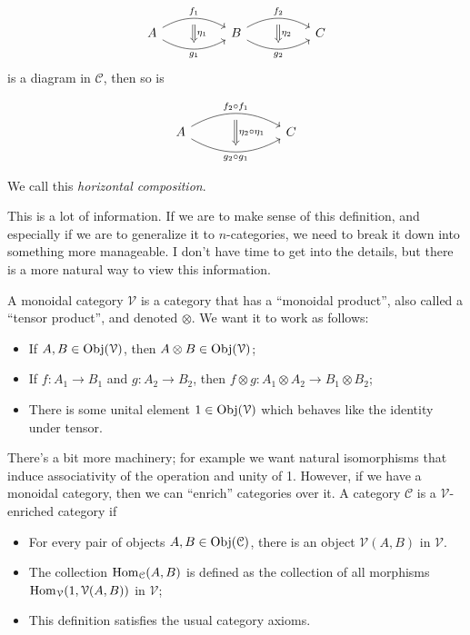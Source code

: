 \documentclass[11pt, letterpaper]{article}
\begin{document}
\begin{definition}
\begin{enumerate}
			\[\begin{tikzcd}[row sep = 5em, column sep = 5em]
				A\ar[r, bend left, "f_1"{name=f1}]\ar[r, bend right, "g_1"'{name=g1}]&B\ar[r, bend left, "f_2"{name=f2}]\ar[r, bend right, "g_2"'{name=g2}]&C
				\arrow[from=f1, to=g1, shorten=5px, Rightarrow, "\eta _1"]\arrow[from=f2, to=g2, shorten=5px, Rightarrow, "\eta _2"]
			\end{tikzcd}\]
			is a diagram in $\mathcal{C} $, then so is\newpage
			\begin{diagram}[ht]
			\[\begin{tikzcd}[row sep = 5em, column sep = 7em]
				A\ar[r, bend left, "f_2\circ f_1"{name=f}]\ar[r, bend right, "g_2\circ g_1"'{name=g}]&C
				\arrow[from=f, to=g, Rightarrow, shorten=5px, "\eta _2\circ \eta _1"]
			\end{tikzcd}\]
			\caption{Horizontal Composition}\label{dgm:10}
			\end{diagram}
			We call this \emph{horizontal composition}.
	\end{enumerate}
\end{definition}

This is a lot of information. If we are to make sense of this definition, and especially if we are to generalize it to $n$-categories, we need to break it down into something more manageable. I don't have time to get into the details, but there is a more natural way to view this information.

A monoidal category $\mathcal{V} $ is a category that has a ``monoidal product'', also called a ``tensor product'', and denoted $\otimes $. We want it to work as follows:
\begin{itemize}
	\item If $A,B\in \operatorname{Obj}(\mathcal{V} ) $, then $A\otimes B\in \operatorname{Obj}(\mathcal{V} ) $;
	\item If $f : A_1 \to B_1$ and $g : A_2 \to B_2$, then $f\otimes g : A_1\otimes A_2 \to B_1\otimes B_2$;
	\item There is some unital element $1\in \operatorname{Obj}(\mathcal{V} ) $ which behaves like the identity under tensor.
\end{itemize}
There's a bit more machinery; for example we want natural isomorphisms that induce associativity of the operation and unity of 1. However, if we have a monoidal category, then we can ``enrich'' categories over it. A category $\mathcal{C} $ is a $\mathcal{V} $-enriched category if
\begin{itemize}
	\item For every pair of objects $A,B\in \operatorname{Obj}(\mathcal{C} ) $, there is an object $\mathcal{V} (A,B)$ in $\mathcal{V} $.
	\item The collection $\operatorname{Hom}_{\mathcal{C} }(A, B) $ is defined as the collection of all morphisms $\operatorname{Hom}_{\mathcal{V} }(1, \mathcal{V} (A,B)) $ in $\mathcal{V} $;
	\item This definition satisfies the usual category axioms.
\end{itemize}
\end{document}

